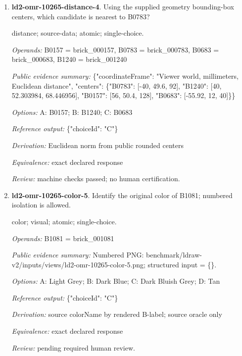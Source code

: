 \begin{enumerate}
\par{\small shape-match; visual; atomic; single-choice.\par\textit{Operands:} B0813 = brick\_000813, B0758 = brick\_000758, B0783 = brick\_000783, B0327 = brick\_000327, B1206 = brick\_001206\par\textit{Public evidence summary:} Numbered PNG: benchmark/ldraw-v2/inputs/views/ld2-omr-10265-shape-match-4.png; structured input = \{\}.\par\textit{Options:} A: B0813; B: B0327; C: B1206; D: B0758\par\textit{Reference output:} \{"choiceId": "D"\}\par\textit{Derivation:} source partNumber equality across labeled candidates; source oracle only\par\textit{Equivalence:} same source partNumber; ignore color and pose; perceptual equivalence pending\par\textit{Review:} pending required human review.}
\item \textbf{ld2-omr-10265-distance-4}. Using the supplied geometry bounding-box centers, which candidate is nearest to B0783?
\par{\small distance; source-data; atomic; single-choice.\par\textit{Operands:} B0157 = brick\_000157, B0783 = brick\_000783, B0683 = brick\_000683, B1240 = brick\_001240\par\textit{Public evidence summary:} \{"coordinateFrame": "Viewer world, millimeters, Euclidean distance", "centers": \{"B0783": [-40, 49.6, 92], "B1240": [40, 52.303984, 68.446956], "B0157": [56, 50.4, 128], "B0683": [-55.92, 12, 40]\}\}\par\textit{Options:} A: B0157; B: B1240; C: B0683\par\textit{Reference output:} \{"choiceId": "C"\}\par\textit{Derivation:} Euclidean norm from public rounded centers\par\textit{Equivalence:} exact declared response\par\textit{Review:} machine checks passed; no human certification.}
\item \textbf{ld2-omr-10265-color-5}. Identify the original color of B1081; numbered isolation is allowed.
\par{\small color; visual; atomic; single-choice.\par\textit{Operands:} B1081 = brick\_001081\par\textit{Public evidence summary:} Numbered PNG: benchmark/ldraw-v2/inputs/views/ld2-omr-10265-color-5.png; structured input = \{\}.\par\textit{Options:} A: Light Grey; B: Dark Blue; C: Dark Bluish Grey; D: Tan\par\textit{Reference output:} \{"choiceId": "C"\}\par\textit{Derivation:} source colorName by rendered B-label; source oracle only\par\textit{Equivalence:} exact declared response\par\textit{Review:} pending required human review.}

\end{enumerate}
